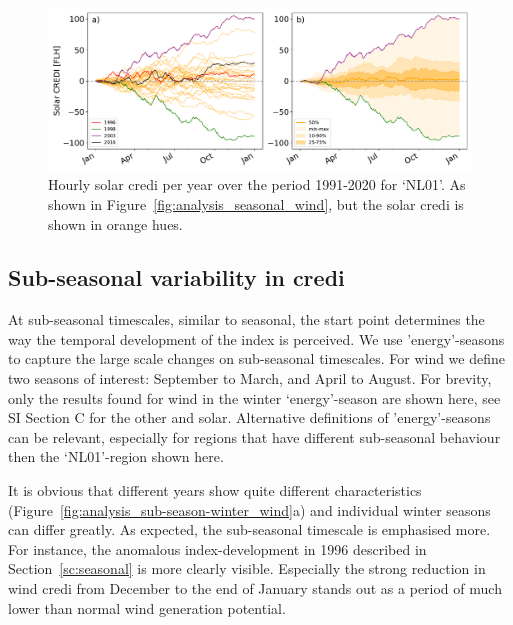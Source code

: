 \documentclass[12pt]{iopart}
\newcommand{\credi}[0]{{\sc credi}}
\newcommand{\sdi}[0]{{\sc solar credi}}
\newcommand{\wdi}[0]{{\sc wind credi}}
\begin{document}
\begin{figure}[t]
        \centering
        \includegraphics[width=\textwidth]{Figures/SolarCREDI_annual} 
        \caption{
                Hourly \sdi{} per year over the period 1991-2020 for `NL01'. 
                As shown in Figure~\ref{fig:analysis_seasonal_wind}, but the \sdi{} is shown in orange hues.
        }
        \label{fig:analysis_seasonal_solar}
\end{figure}







\subsection{Sub-seasonal variability in \credi}\label{sc:subseasonal}

At sub-seasonal timescales, similar to seasonal, the start point determines the way the temporal development of the index is perceived. 
We use 'energy'-seasons to capture the large scale changes on sub-seasonal timescales. 
For wind we define two seasons of interest: September to March, and April to August. 
For brevity, only the results found for wind in the winter `energy'-season are shown here, see SI Section C for the other and solar. 
Alternative definitions of 'energy'-seasons can be relevant, especially for regions that have different sub-seasonal behaviour then the `NL01'-region shown here.

It is obvious that different years show quite different characteristics (Figure~\ref{fig:analysis_sub-season-winter_wind}a) and individual winter seasons can differ greatly. 
As expected, the sub-seasonal timescale is emphasised more. 
For instance, the anomalous index-development in 1996 described in Section~\ref{sc:seasonal} is more clearly visible. 
Especially the strong reduction in \wdi{} from December to the end of January stands out as a period of much lower than normal wind generation potential.
\end{document}
